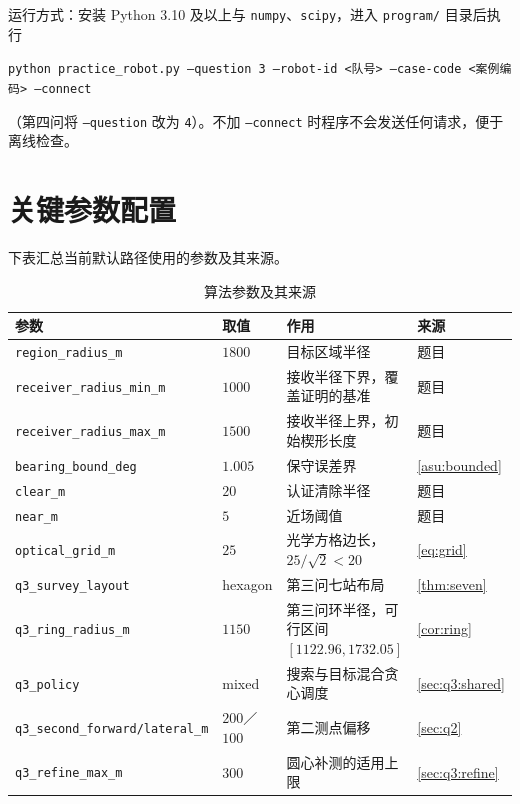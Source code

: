 \begin{appendices}
\noindent 运行方式：安装 Python 3.10 及以上与 \texttt{numpy}、\texttt{scipy}，进入 \texttt{program/} 目录后执行
\begin{center}
\texttt{python practice\_robot.py --question 3 --robot-id <队号> --case-code <案例编码> --connect}
\end{center}
（第四问将 \texttt{--question} 改为 \texttt{4}）。不加 \texttt{--connect} 时程序不会发送任何请求，便于离线检查。

\section{关键参数配置}\label{app:params}

下表汇总当前默认路径使用的参数及其来源。

\begin{table}[H]
  \caption{算法参数及其来源}\label{tab:params}\centering\small
  \begin{tabularx}{\textwidth}{@{}l l L l@{}}
    \toprule[1.5pt]
    参数 & 取值 & 作用 & 来源 \\
    \midrule[1pt]
    \texttt{region\_radius\_m}        & $1800$   & 目标区域半径 & 题目 \\
    \texttt{receiver\_radius\_min\_m} & $1000$   & 接收半径下界，覆盖证明的基准 & 题目 \\
    \texttt{receiver\_radius\_max\_m} & $1500$   & 接收半径上界，初始楔形长度 & 题目 \\
    \texttt{bearing\_bound\_deg}      & $1.005$  & 保守误差界 & \cref{asu:bounded} \\
    \texttt{clear\_m}                 & $20$     & 认证清除半径 & 题目 \\
    \texttt{near\_m}                  & $5$      & 近场阈值 & 题目 \\
    \texttt{optical\_grid\_m}         & $25$     & 光学方格边长，$25/\sqrt2<20$ & \cref{eq:grid} \\
    \texttt{q3\_survey\_layout}       & hexagon  & 第三问七站布局 & \cref{thm:seven} \\
    \texttt{q3\_ring\_radius\_m}      & $1150$   & 第三问环半径，可行区间 $[1122.96,1732.05]$ & \cref{cor:ring} \\
    \texttt{q3\_policy}               & mixed    & 搜索与目标混合贪心调度 & \cref{sec:q3:shared} \\
    \texttt{q3\_second\_forward/lateral\_m} & $200$／$100$ & 第二测点偏移 & \cref{sec:q2} \\
    \texttt{q3\_refine\_max\_m}       & $300$    & 圆心补测的适用上限 & \cref{sec:q3:refine} \\

\end{tabularx}
\end{table}
\end{appendices}
